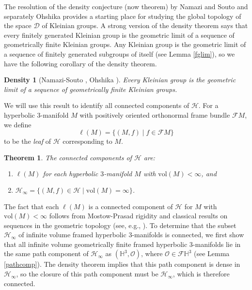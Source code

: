 \documentclass[11pt,leqno]{article}
\newtheorem{introtheorem}{Theorem}
\newtheorem*{density*}{Density}
\theoremstyle{introdef}
\numberwithin{lemma}{section}
\theoremstyle{definition}
\begin{document}
The resolution of the density conjecture (now theorem) by Namazi and Souto \cite{NAM} and separately Ohshika \cite{OHS} provides a starting place for studying the global topology of the space $\mathcal{D}$ of Kleinian groups. A strong version of the density theorem \cite[Corollary 12.3]{NAM} says that every finitely generated Kleinian group is the geometric limit of a sequence of geometrically finite Kleinian groups. Any Kleinian group is the geometric limit of a sequence of finitely generated subgroups of itself (see Lemma \ref{fglim}), so we have the following corollary of the density theorem.

\begin{density*}[Namazi-Souto \cite{NAM}, Ohshika \cite{OHS}]
    Every Kleinian group is the geometric limit of a sequence of geometrically finite Kleinian groups.
\end{density*}

We will use this result to identify all connected components of $\mathcal{H}$. For a hyperbolic $3$-manifold $M$ with positively oriented orthonormal frame bundle $\mathcal{F}M$, we define \[\ell(M)=\{(M,f)\;|\;f\in\mathcal{F}M\}\] to be the \textit{leaf} of $\mathcal{H}$ corresponding to $M$. 

\begin{introtheorem}
\label{introthm-connectedcomponents}
    The connected components of $\mathcal{H}$ are:
    \begin{enumerate}
        \item $\ell(M)$ for each hyperbolic $3$-manifold $M$ with $\mathrm{vol}(M)<\infty$, and
        \item $\mathcal{H}_\infty=\{(M,f)\in\mathcal{H}\;|\;\mathrm{vol}(M)=\infty\}$.
    \end{enumerate}
\end{introtheorem}

The fact that each $\ell(M)$ is a connected component of $\mathcal{H}$ for $M$ with $\mathrm{vol}(M)<\infty$ follows from Mostow-Prasad rigidity and classical results on sequences in the geometric topology (see, e.g., \cite[Section E]{BEN}). To determine that the subset $\mathcal{H}_\infty$ of infinite volume framed hyperbolic $3$-manifolds is connected, we first show that all infinite volume geometrically finite framed hyperbolic $3$-manifolds lie in the same path component of $\mathcal{H}_\infty$ as $(\mathbb{H}^3,\mathcal{O})$, where $\mathcal{O}\in\mathcal{F}\mathbb{H}^3$ (see Lemma \ref{pathcomp}). The density theorem implies that this path component is dense in $\mathcal{H}_\infty$, so the closure of this path component must be $\mathcal{H}_\infty$, which is therefore connected.\par
\end{document}
